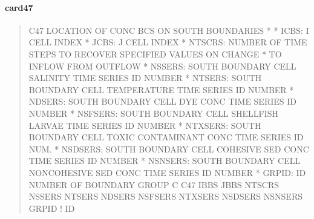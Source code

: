 \documentclass[letterpaper,10pt,english]{sphinxmanual}
\begin{document}
\paragraph{card47}
\label{\detokenize{inputfiles/runcontrol/card47:card47}}\label{\detokenize{inputfiles/runcontrol/card47::doc}}\begin{quote}

\begin{sphinxVerbatim}[commandchars=\\\{\}]
\PYGZhy{}\PYGZhy{}\PYGZhy{}\PYGZhy{}\PYGZhy{}\PYGZhy{}\PYGZhy{}\PYGZhy{}\PYGZhy{}\PYGZhy{}\PYGZhy{}\PYGZhy{}\PYGZhy{}\PYGZhy{}\PYGZhy{}\PYGZhy{}\PYGZhy{}\PYGZhy{}\PYGZhy{}\PYGZhy{}\PYGZhy{}\PYGZhy{}\PYGZhy{}\PYGZhy{}\PYGZhy{}\PYGZhy{}\PYGZhy{}\PYGZhy{}\PYGZhy{}\PYGZhy{}\PYGZhy{}\PYGZhy{}\PYGZhy{}\PYGZhy{}\PYGZhy{}\PYGZhy{}\PYGZhy{}\PYGZhy{}\PYGZhy{}\PYGZhy{}\PYGZhy{}\PYGZhy{}\PYGZhy{}\PYGZhy{}\PYGZhy{}\PYGZhy{}\PYGZhy{}\PYGZhy{}\PYGZhy{}\PYGZhy{}\PYGZhy{}\PYGZhy{}\PYGZhy{}\PYGZhy{}\PYGZhy{}\PYGZhy{}\PYGZhy{}\PYGZhy{}\PYGZhy{}\PYGZhy{}\PYGZhy{}\PYGZhy{}\PYGZhy{}\PYGZhy{}\PYGZhy{}\PYGZhy{}\PYGZhy{}\PYGZhy{}\PYGZhy{}\PYGZhy{}\PYGZhy{}\PYGZhy{}\PYGZhy{}\PYGZhy{}\PYGZhy{}\PYGZhy{}\PYGZhy{}\PYGZhy{}
C47 LOCATION OF CONC BC\PYGZsq{}S ON SOUTH BOUNDARIES
*
*  ICBS:    I CELL INDEX
*  JCBS:    J CELL INDEX
*  NTSCRS:  NUMBER OF TIME STEPS TO RECOVER SPECIFIED VALUES ON CHANGE
*           TO INFLOW FROM OUTFLOW
*  NSSERS:  SOUTH BOUNDARY CELL SALINITY TIME SERIES ID NUMBER
*  NTSERS:  SOUTH BOUNDARY CELL TEMPERATURE TIME SERIES ID NUMBER
*  NDSERS:  SOUTH BOUNDARY CELL DYE CONC TIME SERIES ID NUMBER
*  NSFSERS: SOUTH BOUNDARY CELL SHELLFISH LARVAE TIME SERIES ID NUMBER
*  NTXSERS: SOUTH BOUNDARY CELL TOXIC CONTAMINANT CONC TIME SERIES ID NUM.
*  NSDSERS: SOUTH BOUNDARY CELL COHESIVE SED CONC TIME SERIES ID NUMBER
*  NSNSERS: SOUTH BOUNDARY CELL NON\PYGZhy{}COHESIVE SED CONC TIME SERIES ID NUMBER
*    GRPID: ID NUMBER OF BOUNDARY GROUP
C
C47    IBBS    JBBS  NTSCRS  NSSERS  NTSERS  NDSERS NSFSERS NTXSERS NSDSERS NSNSERS      GRPID ! ID
\end{sphinxVerbatim}
\end{quote}
\end{document}
